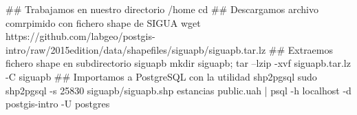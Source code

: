 \lstset{caption=Importación de estancias}
\begin{bash}
## Trabajamos en nuestro directorio /home
cd
## Descargamos archivo comrpimido con fichero shape de SIGUA
wget https://github.com/labgeo/postgis-intro/raw/2015edition/data/shapefiles/siguapb/siguapb.tar.lz
## Extraemos fichero shape en subdirectorio siguapb
mkdir siguapb; tar --lzip -xvf siguapb.tar.lz -C siguapb
## Importamos a PostgreSQL con la utilidad shp2pgsql
sudo shp2pgsql -s 25830 siguapb/siguapb.shp  estancias public.uah  | psql -h localhost -d postgis-intro -U postgres
\end{bash}
